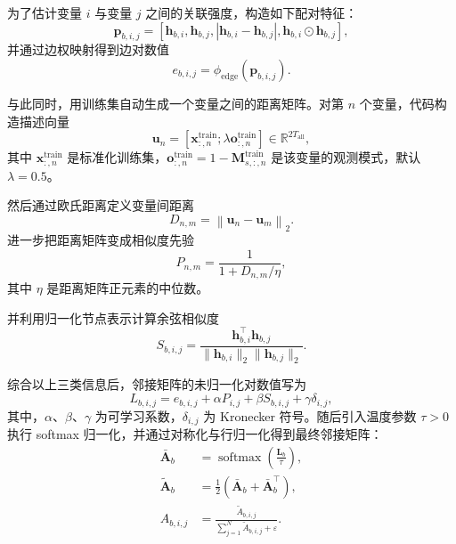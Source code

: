 \documentclass[bachelor, vlined]{DissertUESTC}
\begin{document}
    为了估计变量 $i$ 与变量 $j$ 之间的关联强度，构造如下配对特征：
    \begin{equation}
        \mathbf{p}_{b,i,j} =
        [\mathbf{h}_{b,i},\mathbf{h}_{b,j},|\mathbf{h}_{b,i}-\mathbf{h}_{b,j}|,\mathbf{h}_{b,i}\odot\mathbf{h}_{b,j}],
    \end{equation}
    并通过边权映射得到边对数值
    \begin{equation}
        e_{b,i,j} = \phi_{\mathrm{edge}}(\mathbf{p}_{b,i,j}).
    \end{equation}

    与此同时，用训练集自动生成一个变量之间的距离矩阵。对第 \(n\) 个变量，代码构造描述向量
\begin{equation}
    \bm{u}_n =
    \left[
        \bm{x}^{\text{train}}_{:,n};
        \lambda \bm{o}^{\text{train}}_{:,n}
    \right]
    \in \mathbb{R}^{2T_{\text{all}}},
\end{equation}
其中 \(\bm{x}^{\text{train}}_{:,n}\) 是标准化训练集，\(\bm{o}^{\text{train}}_{:,n}=1-\bm{M}^{\text{train}}_{s,:,n}\) 是该变量的观测模式，默认 \(\lambda=0.5\)。

然后通过欧氏距离定义变量间距离
$$ D_{n,m} = \left\lVert \bm{u}_n - \bm{u}_m \right\rVert_2. $$
进一步把距离矩阵变成相似度先验
\begin{equation}
    P_{n,m} = \frac{1}{1 + D_{n,m}/\eta},
\end{equation}
其中 \(\eta\) 是距离矩阵正元素的中位数。

    并利用归一化节点表示计算余弦相似度
    \begin{equation}
        S_{b,i,j} = \frac{\mathbf{h}_{b,i}^{\top}\mathbf{h}_{b,j}}{\|\mathbf{h}_{b,i}\|_2 \|\mathbf{h}_{b,j}\|_2}.
    \end{equation}

    综合以上三类信息后，邻接矩阵的未归一化对数值写为
    \begin{equation}
        L_{b,i,j} = e_{b,i,j} + \alpha P_{i,j} + \beta S_{b,i,j} + \gamma \delta_{i,j},
    \end{equation}
    其中，$\alpha$、$\beta$、$\gamma$ 为可学习系数，$\delta_{i,j}$ 为 Kronecker 符号。随后引入温度参数 $\tau>0$ 执行 softmax 归一化，并通过对称化与行归一化得到最终邻接矩阵：
    \begin{align}
        \bar{\mathbf{A}}_b &= \operatorname{softmax}\!\left(\frac{\mathbf{L}_b}{\tau}\right), \\
        \tilde{\mathbf{A}}_b &= \frac{1}{2}\left(\bar{\mathbf{A}}_b + \bar{\mathbf{A}}_b^\top\right), \\
        A_{b,i,j} &= \frac{\tilde{A}_{b,i,j}}{\sum_{j=1}^{N} \tilde{A}_{b,i,j} + \varepsilon}.
    \end{align}
\end{document}
